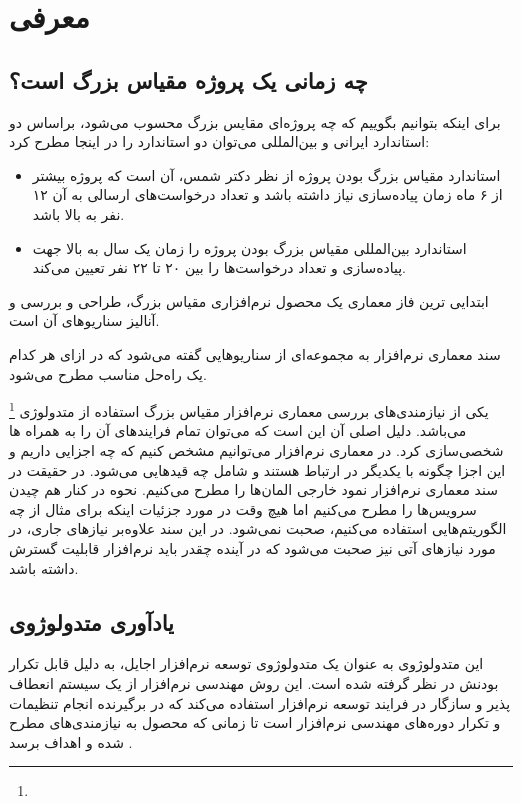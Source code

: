 \section{معرفی}

\subsection{چه زمانی یک پروژه مقیاس بزرگ است؟}

برای اینکه بتوانیم بگوییم که چه پروژه‌ای مقایس بزرگ محسوب می‌شود، براساس دو
استاندارد ایرانی و بین‌المللی می‌توان دو استاندارد را در اینجا مطرح کرد:

\begin{itemize}
    \item استاندارد مقیاس بزرگ بودن پروژه از نظر دکتر شمس، آن است که پروژه بیشتر
    از ۶ ماه زمان پیا‌ده‌سازی نیاز داشته باشد و تعداد درخواست‌های ارسالی به آن
    ۱۲ نفر به بالا باشد.
    \item استاندارد بین‌المللی مقیاس بزرگ بودن پروژه را زمان یک سال به بالا جهت
    پیاده‌سازی و تعداد درخواست‌ها را بین ۲۰ تا ۲۲ نفر تعیین می‌کند.
\end{itemize}

ابتدایی ترین فاز معماری یک محصول نرم‌افزاری مقیاس بزرگ، طراحی و بررسی و آنالیز
سناریو‌های آن است.

سند معماری نرم‌افزار به مجموعه‌ای از سناریو‌هایی گفته می‌شود که در ازای هر کدام
یک راه‌حل مناسب مطرح می‌شود.

یکی از نیازمندی‌های بررسی معماری نرم‌افزار مقیاس بزرگ استفاده از متدولوژی
\footnote{} می‌باشد. دلیل اصلی آن این است
که می‌توان تمام فرایند‌های آن را به همراه ها شخصی‌سازی کرد. در
معماری نرم‌افزار می‌توانیم مشخص کنیم که چه اجزایی داریم و این اجزا چگونه با
یکدیگر در ارتباط هستند و شامل چه قید‌هایی می‌شود. در حقیقت در سند معماری
نرم‌افزار نمود خارجی المان‌ها را مطرح می‌کنیم. نحوه در کنار هم چیدن سرویس‌ها را
مطرح می‌کنیم اما هیچ وقت در مورد جزئیات اینکه برای مثال از چه الگوریتم‌هایی
استفاده می‌کنیم، صحبت نمی‌شود. در این سند علاوه‌بر نیاز‌های جاری، در مورد
نیاز‌های آتی نیز صحبت می‌شود که در آینده چقدر باید نرم‌افزار قابلیت گسترش
 داشته باشد.

\subsection{یادآوری متدولوژوی }

این متدولوژوی به عنوان یک متدولوژوی توسعه نرم‌افزار اجایل، به دلیل قابل تکرار
بودنش در نظر گرفته شده است. این روش مهندسی نرم‌افزار از یک سیستم انعطاف پذیر و
سازگار در فرایند توسعه نرم‌افزار استفاده می‌کند که در برگیرنده انجام تنظیمات و
تکرار دوره‌های مهندسی نرم‌افزار است تا زمانی که محصول به نیازمندی‌های مطرح شده و
اهداف برسد \cite{rupStudy}.

